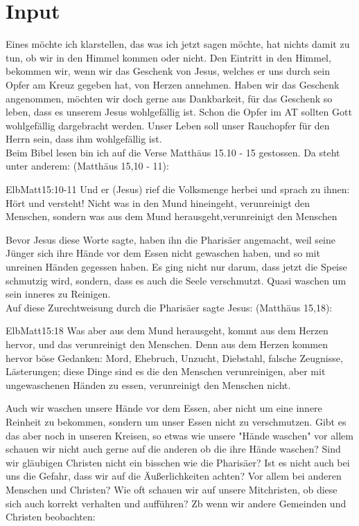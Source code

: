\documentclass[12pt,a4paper]{scrarticle}
\begin{document}
\section{ Input }
Eines möchte ich klarstellen, das was ich jetzt sagen möchte, hat nichts damit zu tun, ob wir in den Himmel kommen oder nicht. Den Eintritt in den Himmel, bekommen wir, wenn wir das Geschenk von Jesus, welches er uns durch sein Opfer am Kreuz gegeben hat, von Herzen annehmen. Haben wir das Geschenk angenommen, möchten wir doch gerne aus Dankbarkeit, für das Geschenk so leben, dass es unserem Jesus wohlgefällig ist. Schon die Opfer im AT sollten Gott wohlgefällig dargebracht werden. Unser Leben soll unser Rauchopfer für den Herrn sein, dass ihm wohlgefällig ist.\\
Beim Bibel lesen bin ich auf die Verse Matthäus 15.10 - 15 gestossen. Da steht unter anderem:
(Matthäus 15,10 - 11):
\begin{bibeltext}{Elb}{Matt}{15:10-11}
Und er (Jesus) rief die Volksmenge herbei und sprach zu ihnen: \glqq{}Hört und versteht! Nicht was in den Mund hineingeht, verunreinigt den Menschen, sondern was aus dem Mund herausgeht,verunreinigt den Menschen\grqq
\end{bibeltext}
Bevor Jesus diese Worte sagte, haben ihn die Pharisäer angemacht, weil seine Jünger sich ihre Hände vor dem Essen nicht gewaschen haben, und so mit unreinen Händen gegessen haben. Es ging nicht nur darum, dass jetzt die Speise schmutzig wird, sondern, dass es auch die Seele verschmutzt. Quasi waschen um sein inneres zu Reinigen.\\
Auf diese Zurechtweisung durch die Pharisäer sagte Jesus:
(Matthäus 15,18):
\begin{bibeltext}{Elb}{Matt}{15:18}
\glqq{}Was aber aus dem Mund herausgeht, kommt aus dem Herzen hervor, und das verunreinigt den Menschen. Denn aus dem Herzen kommen hervor böse Gedanken: Mord, Ehebruch, Unzucht, Diebstahl, falsche Zeugnisse, Lästerungen; diese Dinge sind es die den Menschen verunreinigen, aber mit ungewaschenen Händen zu essen, verunreinigt den Menschen nicht.\grqq
\end{bibeltext}
Auch wir waschen unsere Hände vor dem Essen, aber nicht um eine innere Reinheit zu bekommen, sondern um unser Essen nicht zu verschmutzen. Gibt es das aber noch in unseren Kreisen, so etwas wie unsere "Hände waschen" vor allem schauen wir nicht auch gerne auf die anderen ob die ihre Hände waschen? Sind wir gläubigen Christen nicht ein bisschen wie die Pharisäer? Ist es nicht auch bei uns die Gefahr, dass wir auf die Äußerlichkeiten achten? Vor allem bei anderen Menschen und Christen? Wie oft schauen wir auf unsere Mitchristen, ob diese sich auch korrekt verhalten und aufführen? Zb wenn wir andere Gemeinden und Christen beobachten: 
\end{document}

